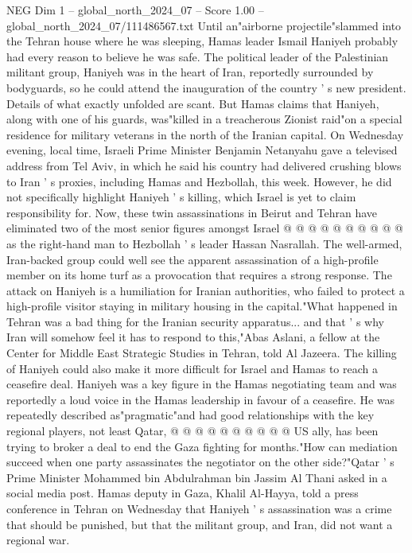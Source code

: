 \begin{textsample}{NEG Dim 1 – global\_north\_2024\_07 – Score 1.00 – global\_north\_2024\_07/111486567.txt}  \label{ex:f1_neg_064}
Until an"airborne projectile"slammed into the Tehran house where he was sleeping, Hamas leader Ismail Haniyeh probably had every reason to believe he was safe.
The political leader of the Palestinian militant group, Haniyeh was in the heart of Iran, reportedly surrounded by bodyguards, so he could attend the inauguration of the country ' s new president.
Details of what exactly unfolded are scant.
But Hamas claims that Haniyeh, along with one of his guards, was"killed in a treacherous Zionist raid"on a special residence for military veterans in the north of the Iranian capital.
On Wednesday evening, local time, Israeli Prime Minister Benjamin Netanyahu gave a televised address from Tel Aviv, in which he said his country had delivered crushing blows to Iran ' s proxies, including Hamas and Hezbollah, this week.
However, he did not specifically highlight Haniyeh ' s killing, which Israel is yet to claim responsibility for.
Now, these twin assassinations in Beirut and Tehran have eliminated two of the most senior figures amongst Israel @ @ @ @ @ @ @ @ @ @ as the right-hand man to Hezbollah ' s leader Hassan Nasrallah.
The well-armed, Iran-backed group could well see the apparent assassination of a high-profile member on its home turf as a provocation that requires a strong response.
The attack on Haniyeh is a humiliation for Iranian authorities, who failed to protect a high-profile visitor staying in military housing in the capital."What happened in Tehran was a bad thing for the Iranian security apparatus... and that ' s why Iran will somehow feel it has to respond to this,"Abas Aslani, a fellow at the Center for Middle East Strategic Studies in Tehran, told Al Jazeera.
The killing of Haniyeh could also make it more difficult for Israel and Hamas to reach a ceasefire deal.
Haniyeh was a key figure in the Hamas negotiating team and was reportedly a loud voice in the Hamas leadership in favour of a ceasefire.
He was repeatedly described as"pragmatic"and had good relationships with the key regional players, not least Qatar, @ @ @ @ @ @ @ @ @ @ US ally, has been trying to broker a deal to end the Gaza fighting for months."How can mediation succeed when one party assassinates the negotiator on the other side?"Qatar ' s Prime Minister Mohammed bin Abdulrahman bin Jassim Al Thani asked in a social media post.
Hamas deputy in Gaza, Khalil Al-Hayya, told a press conference in Tehran on Wednesday that Haniyeh ' s assassination was a crime that should be punished, but that the militant group, and Iran, did not want a regional war.

\end{textsample}
